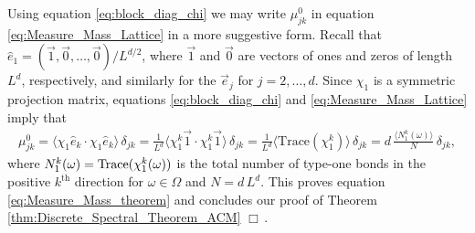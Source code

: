 \documentclass{cmslatex}
\begin{document}
Using equation \eqref{eq:block_diag_chi} we may write
$\mu^0_{jk}$ in equation \eqref{eq:Measure_Mass_Lattice} in a more suggestive
form. Recall that $\hat{e}_1=(\vec{1},\vec{0},\ldots,\vec{0})/L^{d/2}$,
where $\vec{1}$ and $\vec{0}$ are vectors of ones and zeros of length
$L^d$, respectively, and similarly for the $\vec{e}_j$ for
$j=2,\ldots,d$. Since $\chi_1$ is a symmetric projection matrix, equations 
\eqref{eq:block_diag_chi} and \eqref{eq:Measure_Mass_Lattice} imply
that 
%
\begin{align}\label{eq:Measure_Mass_Lattice_Trace}
  \mu^0_{jk}%
       =\langle\chi_1\hat{e}_k\cdot\chi_1\hat{e}_k\rangle\,\delta_{jk}
       =\frac{1}{L^d}\langle\chi_1^k\vec{1}\cdot \chi_1^k\vec{1}\rangle\,\delta_{jk}
       =\frac{1}{L^d}\langle\text{Trace}(\chi_1^k)\rangle\,\delta_{jk}
       =d\,\frac{\langle N_1^k(\omega)\rangle}{N}\,\delta_{jk},       
\end{align}
%
where $N_1^k(\omega)={\rm Trace}(\chi_1^k(\omega))$ is the total number of type-one
bonds in the positive $k^{\text{th}}$ direction for $\omega\in\Omega$ and
$N=d\,L^d$. This proves equation \eqref{eq:Measure_Mass_theorem} and
concludes our proof of Theorem \ref{thm:Discrete_Spectral_Theorem_ACM}
$\Box\,$.       
\end{document}
